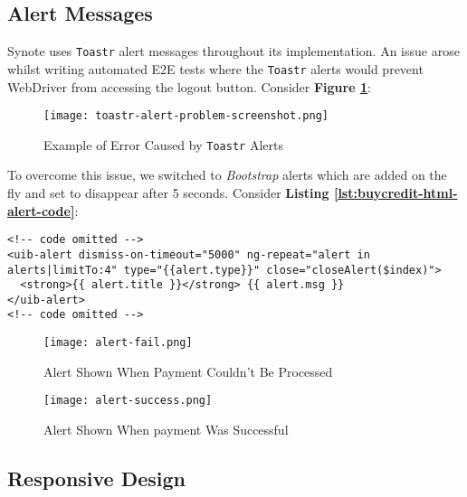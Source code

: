 \subsection{Alert Messages}
\label{subsec:alert-messages}

Synote uses \texttt{Toastr} alert messages throughout its implementation. An issue arose whilst writing automated E2E tests where the \texttt{Toastr} alerts would prevent WebDriver from accessing the logout button. Consider \textbf{Figure \ref{fig:toastr-alert-problem-screenshot}}:\\

\begin{figure}[!hbt]
  \centering
 	\texttt{[image: toastr-alert-problem-screenshot.png]}
  \caption{Example of Error Caused by \texttt{Toastr} Alerts}
 	\label{fig:toastr-alert-problem-screenshot}
\end{figure}

To overcome this issue, we switched to \textit{Bootstrap} alerts which are added on the fly and set to disappear after 5 seconds. Consider \textbf{Listing \ref{lst:buycredit-html-alert-code}}:\\

\begin{listing}[H]
\begin{verbatim}
<!-- code omitted -->
<uib-alert dismiss-on-timeout="5000" ng-repeat="alert in alerts|limitTo:4" type="{{alert.type}}" close="closeAlert($index)">
  <strong>{{ alert.title }}</strong> {{ alert.msg }}
</uib-alert>
<!-- code omitted -->
\end{verbatim}
\label{lst:buycredit-html-alert-code}
\end{listing}

\begin{figure}[!hbt]
  \centering
 	\texttt{[image: alert-fail.png]}
  \caption{Alert Shown When Payment Couldn't Be Processed}
 	\label{fig:alert-success}
\end{figure}

\begin{figure}[!hbt]
  \centering
 	\texttt{[image: alert-success.png]}
  \caption{Alert Shown When payment Was Successful}
 	\label{fig:alert-fail}
\end{figure}

\subsection{Responsive Design}
\label{subsec:responsive-design}

